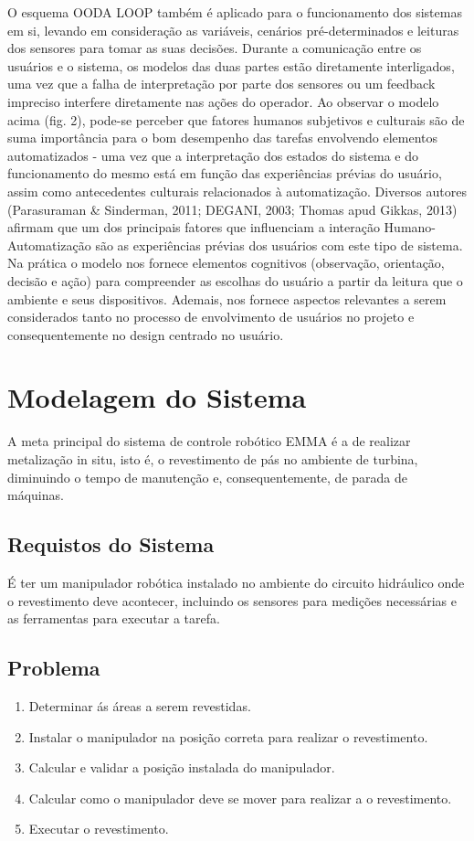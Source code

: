 \documentclass[12pt,a4paper]{article}
\begin{document}
O esquema OODA LOOP também é aplicado para o funcionamento dos sistemas em si, levando em consideração as variáveis, cenários pré-determinados e 
leituras dos sensores para tomar as suas decisões. Durante a comunicação entre os usuários e o sistema, os modelos das duas partes estão diretamente 
interligados, uma vez que a falha de interpretação por parte dos sensores ou um feedback impreciso interfere diretamente nas ações do operador.
Ao observar o modelo acima (fig. 2), pode-se perceber que fatores humanos subjetivos e culturais são de suma importância para o bom desempenho 
das tarefas envolvendo elementos automatizados - uma vez que a interpretação dos estados do sistema e do funcionamento do mesmo está em função das 
experiências prévias do usuário, assim como antecedentes culturais relacionados à automatização. Diversos autores 
(Parasuraman & Sinderman, 2011; DEGANI, 2003; Thomas apud Gikkas, 2013) afirmam que um dos principais fatores que influenciam a 
interação Humano-Automatização são as experiências prévias dos usuários com este tipo de sistema. Na prática o modelo nos fornece elementos cognitivos 
(observação, orientação, decisão e ação) para compreender as escolhas do usuário a partir da leitura que o ambiente e seus dispositivos. Ademais, 
nos fornece aspectos relevantes a serem considerados tanto no processo de envolvimento de usuários no projeto e consequentemente no design centrado 
no usuário.


\section{Modelagem do Sistema}

A meta principal do sistema de controle robótico EMMA é a de realizar metalização in situ, isto é, o revestimento de pás no ambiente de turbina, 
diminuindo o tempo de manutenção e, consequentemente, de parada de máquinas.


\subsection{Requistos do Sistema}
É ter um manipulador robótica instalado no ambiente do circuito hidráulico onde o revestimento deve acontecer, incluindo os sensores para medições 
necessárias e as ferramentas para executar a tarefa.

\subsection{Problema}
\begin {enumerate}
  \item Determinar ás áreas a serem revestidas.
  \item Instalar o manipulador na posição correta para realizar o revestimento.
  \item Calcular e validar a posição instalada do manipulador.
  \item Calcular como o manipulador deve se mover para realizar a o
  revestimento.
  \item Executar o revestimento.
\end{enumerate}
\end{document}
